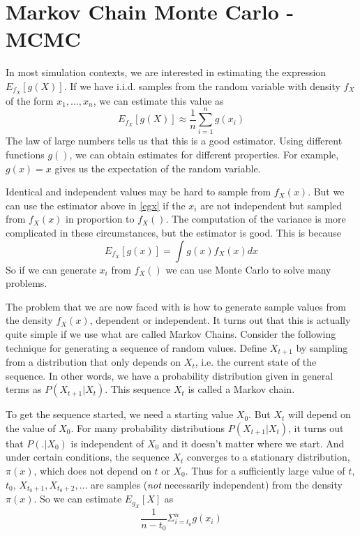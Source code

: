 \section{Markov Chain Monte Carlo - MCMC}
In most simulation contexts, we are interested in estimating the
expression $E_{f_X}[g(X)]$.
If we have i.i.d. samples from the random variable with density $f_X$
of the form $x_1, \ldots, x_n$, we can estimate this value
as
\begin{equation}\label{egx}
 E_{f_X}[g(X)] \approx \frac{1}{n} \sum_{i=1}^n g(x_i)
\end{equation}
The law of large numbers tells us that this is a good estimator.
Using different functions $g()$, we can obtain estimates for different
properties.  For example, $g(x) = x$ gives us the expectation of the
random variable.


Identical and independent values may be hard to sample from $f_X(x)$.
But we can use the estimator above in \ref{egx} if the $x_i$ are not
independent but sampled from $f_X(x)$ in proportion to $f_X()$.  The
computation of the variance is more complicated in these
circumstances, but the estimator is good.  This is because
\begin{equation}
  E_{f_X}[g(x)] = \int g(x) f_X(x) dx
\end{equation}
So if we can generate $x_i$ from $f_X()$ we can use Monte Carlo to
solve many problems.

The problem that we are now faced with is how to generate sample
values from the density $f_X(x)$, dependent or independent.  It turns
out that this is actually quite simple if we use what are called
Markov Chains.  Consider the following technique for generating a
sequence of random values.  Define $X_{t+1}$ by sampling from a
distribution that only depends on $X_t$, i.e. the current state of the
sequence.  In other words, we have a probability distribution given in
general terms as $P(X_{t+1} \vert X_t)$.  This sequence ${X_t}$ is
called a Markov chain.

To get the sequence started, we need a starting value $X_0$.  But
$X_{t}$ will depend on the value of $X_0$.  For many probability
distributions $P(X_{t+1} | X_t)$, it turns out that $P(. | X_0)$ is
independent of $X_0$ and it doesn't matter where we start.  And under
certain conditions, the sequence ${X_t}$ converges to a stationary
distribution, $\pi(x)$, which does not depend on $t$ or $X_0$.  Thus
for a sufficiently large value of $t$, $t_0$, $X_{t_{0} + 1}, X_{t_{0}
  + 2}, \ldots$ are samples (\textit{not} necessarily independent)
from the density $\pi(x)$.
So we can estimate $E_{g_X}[X]$ as 
\begin{equation}
  \frac{1}{n - t_0}\Sigma_{i = t_0}^n g(x_i)
\end{equation}


